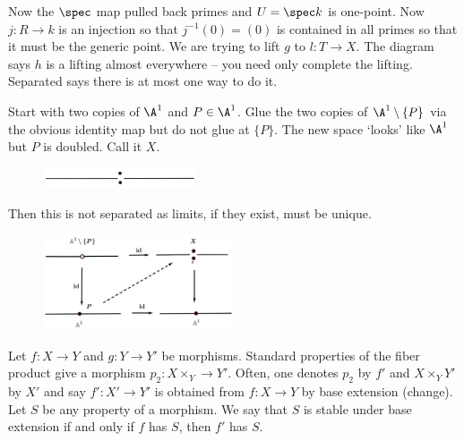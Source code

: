 \noindent Now the $\spec$ map pulled back primes and $U=\spec k$ is one-point. Now $j: R \to k$ is an injection so that $j^{-1}(0)=(0)$ is contained in all primes so that it must be the generic point. We are trying to lift $g$ to $l: T \to X$. The diagram says $h$ is a lifting almost everywhere -- you need only complete the lifting. Separated says there is at most one way to do it. 


\begin{ex}
Start with two copies of $\A^1$ and $P \in \A^1$. Glue the two copies of $\A^1 \setminus\{P\}$ via the obvious identity map but do not glue at $\{P\}$. The new space `looks' like $\A^1$ but $P$ is doubled. Call it $X$. 
	\begin{figure}[H]
	   \centering
	   \includegraphics[width=0.4\textwidth]{doublepoint.png} 
	\end{figure}
Then this is not separated as limits, if they exist, must be unique.
	\begin{figure}[H]
	   \centering
	   \includegraphics[width=0.5\textwidth]{doublepoint2.png} 
	\end{figure}
\end{ex}


\begin{dfn}
Let $f: X \to Y$ and $g: Y \to Y'$ be morphisms. Standard properties of the fiber product give a morphism $p_2: X \times_Y \to Y'$. Often, one denotes $p_2$ by $f'$ and $X \times_Y Y'$ by $X'$ and say $f': X' \to Y'$ is obtained from $f: X \to Y$ by base extension (change). Let $S$ be any property of a morphism. We say that $S$ is stable under base extension if and only if $f$ has $S$, then $f'$ has $S$.
\end{dfn}


